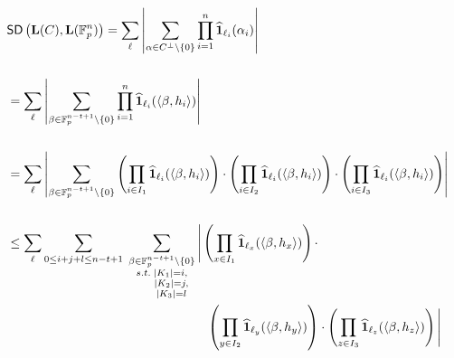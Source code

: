 {\allowdisplaybreaks
\begin{align}
&\SD{\vec{L}(C)}{\vec{L}(\F^n_p)}=\sum_{\vec{\ell}} \left|\sum_{\alpha\in C^{\bot}\setminus{\{0\}}}\prod^n_{i=1}\widehat{\mathbf{1}}_{\ell_i}(\alpha_i) \right|\label{eq:2}\\ &\nonumber \\
&=\sum_{\vec{\ell}}\left|\sum_{\beta\in \F^{n-t+1}_p\setminus{\{0\}}}\prod^n_{i=1}\widehat{\mathbf{1}}_{\ell_i}(\ip{\beta,h_i})\right|\label{eq:3}\\ &\nonumber \\
&= \sum_{\vec{\ell}}\left|\sum_{\beta\in  \F^{n-t+1}_p\setminus{\{0\}}}\left(\prod_{i\in I_1}\widehat{\mathbf{1}}_{\ell_i}(\ip{\beta,h_i})\right)\cdot \left(\prod_{i\in I_2}\widehat{\mathbf{1}}_{\ell_i}(\ip{\beta,h_i})\right)\cdot \left(\prod_{i\in I_3}\widehat{\mathbf{1}}_{\ell_i}(\ip{\beta,h_i})\right)\right|\label{eq:4}\\ &\nonumber \\
&\leq \sum_{\vec{\ell}}\sum_{0\leq i+j+l\leq n-t+1} \; \sum_{\substack{\beta\in \F^{n-t+1}_p\setminus{\{0\}}\label{eq:5} \\ s.t. \; |K_1|=i,\\ \indent |K_2|=j,\\ \indent |K_3|=l}} \Bigg|\left(\prod_{x\in I_1}\widehat{\mathbf{1}}_{\ell_x}(\ip{\beta,h_x})\right)\cdot \\
& \hphantom{{}=\sum_{\vec{\ell}}\sum_{0\leq i+j+l\leq n-t+1} \sum_{\substack{\beta\in \F^{n-t+1}_p\setminus{\{0\}} s.t. \\ |K_1|=i,\\ |K_2|=j,\\ |K_3|=l}}} \left(\prod_{y\in I_2}\widehat{\mathbf{1}}_{\ell_y}(\ip{\beta,h_y})\right)\cdot \left(\prod_{z\in I_3}\widehat{\mathbf{1}}_{\ell_z}(\ip{\beta,h_z})\right) \Bigg| \nonumber \\ &\nonumber \\

\end{align}}
